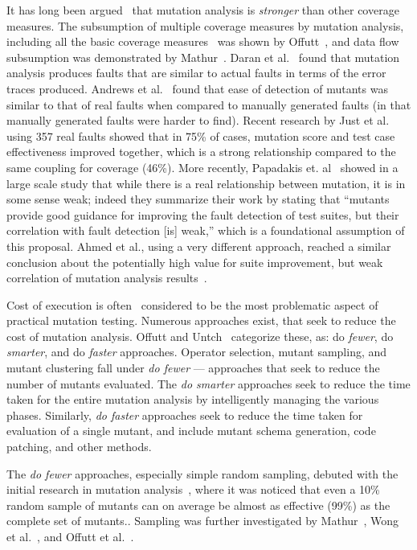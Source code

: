 It has long been argued~\cite{budd1980mutation} that mutation analysis is \emph{stronger}
than other coverage measures. The subsumption of multiple coverage
measures by mutation analysis, including all the basic coverage measures~\cite{myer1979art}
was shown by Offutt~\cite{offutt1996subsumption}, and data flow
subsumption was demonstrated by Mathur~\cite{mathur1994empirical}.
Daran et al.~\cite{daran1996software} found that mutation analysis produces
faults that are similar to actual faults in terms of the error traces produced. Andrews et
al.~\cite{andrews2005mutation,andrews2006using} found that ease of detection
of mutants was similar to that of real faults when compared to manually
generated faults (in that manually generated faults were harder to find).
Recent research by Just et al.~\cite{just2014mutants} using 357 real faults
showed that in 75\% of cases, mutation score and test case
effectiveness improved together, which is a strong relationship
compared to the same coupling for coverage (46\%).  More recently,
Papadakis et. al~\cite{papadakis2018mutation} showed in a large scale study that while there is a
real relationship between mutation, it is in some sense weak; indeed
they summarize their work by stating that ``mutants provide good guidance for improving the
fault detection of test suites, but their correlation with fault
detection [is] weak,'' which is a foundational assumption of this
proposal.  Ahmed et al., using a very different approach, reached a similar
conclusion about the potentially high value for suite improvement, but weak correlation of mutation
analysis results~\cite{ahmed_testedness}.

Cost of execution is often~\cite{jia2011analysis} considered 
to be the most problematic aspect of practical mutation testing.
Numerous approaches exist, that seek to reduce the cost of mutation
analysis. Offutt and Untch~\cite{offutt2001mutation} categorize these,
as: do \textit{fewer}, do \textit{smarter}, and do \textit{faster} approaches.
Operator selection, mutant sampling, and mutant clustering fall under
\textit{do fewer} --- approaches that seek to reduce the number of mutants
evaluated.  The \emph{do smarter} approaches seek to reduce the time taken
for the entire mutation analysis by intelligently managing the various phases.
Similarly, \textit{do faster} approaches seek to
reduce the time taken for evaluation of a single mutant, and include
mutant schema generation, code patching, and other methods.

The \emph{do fewer} approaches, especially simple random sampling,
debuted with the initial research in mutation
analysis~\cite{budd1980mutation,acree1980mutation}, where it was noticed that
even a 10\% random sample of mutants can on average be almost as effective (99\%)
as the complete set of mutants..
Sampling was further investigated by Mathur~\cite{mathur1991performance}, Wong et
al.~\cite{wong1993mutation,wong1995reducing}, and Offutt et al.~\cite{offutt1993experimental}.

